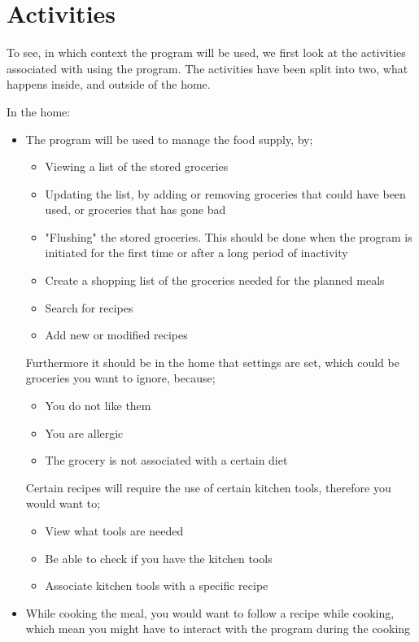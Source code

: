 \section{Activities}
To see, in which context the program will be used, we first look at the activities associated with using the program. The activities have been split into  two, what happens inside, and outside of the home.

In the home:
\begin{itemize}
\item The program will be used to manage the food supply, by;
	\begin{itemize}
		\item Viewing a list of the stored groceries
		\item Updating the list, by adding or removing groceries that could have been used, or groceries that has gone bad
		\item "Flushing" the stored groceries. This should be done when the program is initiated for the first time or after a long period of inactivity
		\item Create a shopping list of the groceries needed for the planned meals
		\item Search for recipes
		\item Add new or modified recipes
	\end{itemize}
	Furthermore it should be in the home that settings are set, which could be groceries you want to ignore, because;
	\begin{itemize}
		\item You do not like them
		\item You are allergic
		\item The grocery is not associated with a certain diet
	\end{itemize}
	Certain recipes will require the use of certain kitchen tools, therefore you would want to;
	\begin{itemize}
		\item View what tools are needed
		\item Be able to check if you have the kitchen tools
		\item Associate kitchen tools with a specific recipe
	\end{itemize}
	\item While cooking the meal, you would want to follow a recipe while cooking, which mean you might have to interact with the program during the cooking
\end{itemize}

